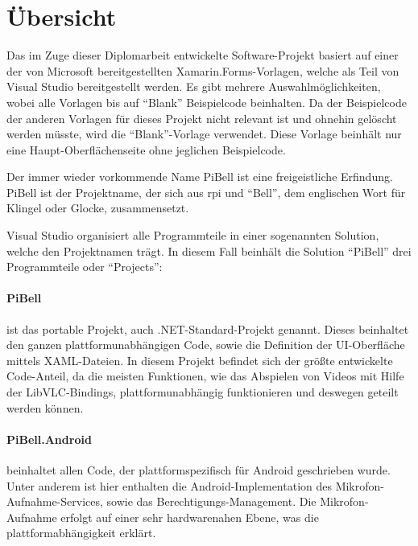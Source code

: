 
\label{ch:prog-doc}
\section{Übersicht}
Das im Zuge dieser Diplomarbeit entwickelte Software-Projekt basiert auf einer der von Microsoft bereitgestellten Xamarin.Forms-Vorlagen, welche als Teil von Visual Studio bereitgestellt werden.
Es gibt mehrere Auswahlmöglichkeiten, wobei alle Vorlagen bis auf \enquote{Blank} Beispielcode beinhalten.
Da der Beispielcode der anderen Vorlagen für dieses Projekt nicht relevant ist und ohnehin gelöscht werden müsste, wird die \enquote{Blank}-Vorlage verwendet.
Diese Vorlage beinhält nur eine Haupt-Oberflächenseite ohne jeglichen Beispielcode.

Der immer wieder vorkommende Name PiBell ist eine freigeistliche Erfindung. PiBell ist der Projektname, der sich aus \acl{rpi} und \enquote{Bell}, dem englischen Wort für Klingel oder Glocke, zusammensetzt.

Visual Studio organisiert alle Programmteile in einer sogenannten Solution, welche den Projektnamen trägt. In diesem Fall beinhält die Solution \enquote{PiBell} drei Programmteile oder \enquote{Projects}:
\paragraph{PiBell} ist das portable Projekt, auch .NET-Standard-Projekt genannt.
Dieses beinhaltet den ganzen plattformunabhängigen Code, sowie die Definition der UI-Oberfläche mittels XAML-Dateien.
In diesem Projekt befindet sich der größte entwickelte Code-Anteil, da die meisten Funktionen, wie das Abspielen von Videos mit Hilfe der LibVLC-Bindings, plattformunabhängig funktionieren und deswegen geteilt werden können.

\paragraph{PiBell.Android} beinhaltet allen Code, der plattformspezifisch für Android geschrieben wurde.
Unter anderem ist hier enthalten die Android-Implementation des Mikrofon-Auf\-nahme-Services, sowie das Berechtigungs-Management.
Die Mikrofon-Aufnahme erfolgt auf einer sehr hardwarenahen Ebene, was die plattformabhängigkeit erklärt.

